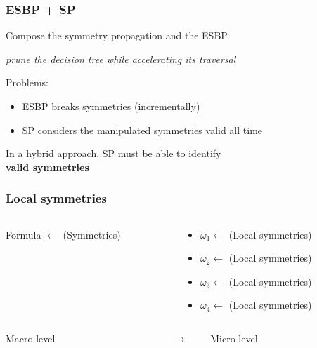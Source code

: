 \documentclass{beamer}
\begin{document}
\begin{frame}
\frametitle{ESBP + SP~\cite{metin2019composing}}


Compose the symmetry propagation and the ESBP\\
\begin{center}
	\textit{prune the decision tree while accelerating its traversal}
\end{center}

\vfill

Problems:
\begin{itemize}
	\item ESBP breaks symmetries (incrementally)
	\item SP considers the manipulated symmetries valid all time
\end{itemize}

\vfill
\centering
In a hybrid approach, SP must be able to identify\\ \textbf{valid symmetries}
\end{frame}
\begin{frame}
\frametitle{Local symmetries}
  \begin{columns}[t]
	\begin{column}[c]{.4\textwidth}
		Formula $\leftarrow$ (Symmetries)
	\end{column}
	\begin{column}[c]{.5\textwidth}
		\begin{itemize}
			\item[] $\omega_1 \leftarrow$ (Local symmetries)
			\item[] $\omega_2 \leftarrow$ (Local symmetries)
			\item[] $\omega_3 \leftarrow$ (Local symmetries)
			\item[] $\omega_4 \leftarrow$ (Local symmetries)
			\smallskip
			 \visible<3>{$\leftarrow$ (Local symmetries)}
		\end{itemize}
\end{column}
\end{columns}

\vfill

  \begin{columns}[t]
	\begin{column}[c]{.3\textwidth}
		Macro level
	\end{column}
	\begin{column}[c]{.5\textwidth}
		$\rightarrow \qquad$ Micro level
	\end{column}
\end{columns}

\vfill
{}
\end{frame}
\end{document}
